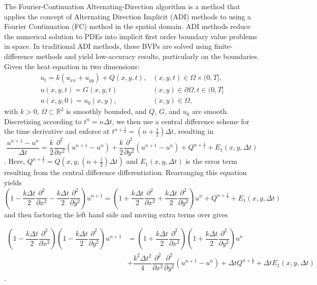 \documentclass[11pt]{amsart}
\begin{document}
The Fourier-Continuation Alternating-Direction algorithm is a method that applies the concept of Alternating Direction Implicit (ADI) methods to using a Fourier Continuation (FC) method in the spatial domain.  ADI methods reduce the numerical solution to PDEs into implicit first order boundary value problems in space.  In traditional ADI methods, these  BVPs are solved using finite-difference methods and yield low-accuracy results, particularly on the boundaries.  \\
Given the heat equation in two dimensions:
\begin{eqnarray}
u_t=k(u_{xx}+u_{yy}) + Q(x,y,t), & (x,y,t) \in \Omega \times (0,T], \nonumber \\
u(x,y,t) = G(x,y,t) & (x,y) \in \partial \Omega, t \in (0,T] \\
u(x,y,0)=u_0(x,y), & (x,y) \in \Omega, \nonumber 
\end{eqnarray}
with $k>0$, $\Omega \subset \mathbb{R}^2$ is smoothly bounded, and $Q$, $G$, and $u_0$ are smooth.  Discretizing according to $t^n=n\Delta t$, we then use a central difference scheme for the time derivative and enforce at $t^{n+\frac{1}{2}}=(n+\frac{1}{2})\Delta t$, resulting in
\begin{equation}
\dfrac{u^{n+1}-u^n}{\Delta t} = \dfrac{k}{2}\dfrac{\partial^2}{\partial x^2}(u^{n+1}-u^n) +\dfrac{k}{2}\dfrac{\partial^2}{\partial y^2}(u^{n+1}-u^n) + Q^{n+\frac{1}{2}} + E_1(x,y,\Delta t)
\end{equation}.
Here, $Q^{n+\frac{1}{2}}= Q(x,y,(n+\frac{1}{2})\Delta t)$ and $E_1(x,y,\Delta t)$ is the error term resulting from the central difference differentiation.  
Rearranging this equation yields
\begin{equation}
\left(1-\dfrac{k\Delta t}{2}\dfrac{\partial ^2 }{\partial x ^2 } - \dfrac{k\Delta t}{2}\dfrac{\partial ^2 }{\partial y ^2 }\right)u^{n+1}= \left(1+\dfrac{k\Delta t}{2}\dfrac{\partial ^2 }{\partial x ^2 } + \dfrac{k\Delta t}{2}\dfrac{\partial ^2 }{\partial y ^2 }\right)u^n + Q^{n+\frac{1}{2}}+E_1(x,y,\Delta t)
\end{equation}
and then factoring the left hand side and moving extra terms over gives 

\begin{equation}
\begin{aligned}
\left(1-\dfrac{k\Delta t}{2}\dfrac{\partial ^2}{\partial x^2} \right) \left(1-\dfrac{k\Delta t}{2}\dfrac{\partial ^2}{\partial y^2} \right)u^{n+1}& =  
\left(1+\dfrac{k\Delta t}{2}\dfrac{\partial ^2}{\partial x^2} \right) \left(1+\dfrac{k\Delta t}{2}\dfrac{\partial ^2}{\partial y^2} \right)u^n\\ &+ \dfrac{k^2 \Delta t^2}{4}\dfrac{\partial ^ 2}{\partial x^2}\dfrac{\partial ^2}{\partial y ^ 2} (u^{n+1}-u^n) + \Delta t Q^{n + \frac{1}{2}} + \Delta t E_1(x,y,\Delta t)
\end{aligned}
\end{equation}.
\end{document}
